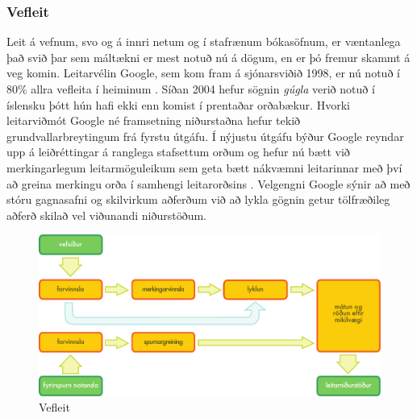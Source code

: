\begin{multicols}{2}
\subsubsection{Vefleit}

Leit á vefnum, svo og á innri netum og í stafrænum bókasöfnum, er væntanlega það svið þar sem máltækni er mest notuð nú á dögum, en er þó fremur skammt á veg komin. Leitarvélin Google, sem kom fram á sjónarsviðið 1998, er nú notuð í 80\% allra vefleita í heiminum \cite{spi1}.  Síðan 2004 hefur sögnin \textit{gúgla} verið notuð í íslensku þótt hún hafi ekki enn komist í prentaðar orðabækur. Hvorki leitarviðmót Google né framsetning niðurstaðna hefur tekið grundvallarbreytingum frá fyrstu útgáfu. Í nýjustu útgáfu býður Google reyndar upp á leiðréttingar á ranglega stafsettum orðum og hefur nú bætt við merkingarlegum leitarmöguleikum sem geta bætt nákvæmni leitarinnar með því að greina merkingu orða í samhengi leitarorðsins \cite{pc1}.  Velgengni Google sýnir að með stóru gagnasafni og skilvirkum aðferðum við að lykla gögnin getur tölfræðileg aðferð skilað vel viðunandi niðurstöðum.

\begin{figure}[htb]
  \center
  \includegraphics[width=\textwidth]{../_media/icelandic/web_search_architecture}
  \caption{Vefleit}
  \label{fig:websearcharch_is}
\end{figure}


\end{multicols}
